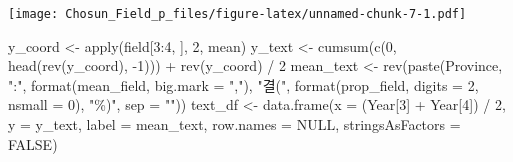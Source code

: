 \documentclass[
]{article}
\newenvironment{Shaded}{\begin{snugshade}}{\end{snugshade}}
\newcommand{\AttributeTok}[1]{\textcolor[rgb]{0.77,0.63,0.00}{#1}}
\newcommand{\ConstantTok}[1]{\textcolor[rgb]{0.00,0.00,0.00}{#1}}
\newcommand{\DecValTok}[1]{\textcolor[rgb]{0.00,0.00,0.81}{#1}}
\newcommand{\FunctionTok}[1]{\textcolor[rgb]{0.00,0.00,0.00}{#1}}
\newcommand{\NormalTok}[1]{#1}
\newcommand{\OtherTok}[1]{\textcolor[rgb]{0.56,0.35,0.01}{#1}}
\newcommand{\SpecialCharTok}[1]{\textcolor[rgb]{0.00,0.00,0.00}{#1}}
\newcommand{\StringTok}[1]{\textcolor[rgb]{0.31,0.60,0.02}{#1}}
\begin{document}
\texttt{[image: Chosun\_Field\_p\_files/figure-latex/unnamed-chunk-7-1.pdf]}

\begin{Shaded}
\begin{Highlighting}[]
\NormalTok{y\_coord }\OtherTok{\textless{}{-}} \FunctionTok{apply}\NormalTok{(field[}\DecValTok{3}\SpecialCharTok{:}\DecValTok{4}\NormalTok{, ], }\DecValTok{2}\NormalTok{, mean)}
\NormalTok{y\_text }\OtherTok{\textless{}{-}} \FunctionTok{cumsum}\NormalTok{(}\FunctionTok{c}\NormalTok{(}\DecValTok{0}\NormalTok{, }\FunctionTok{head}\NormalTok{(}\FunctionTok{rev}\NormalTok{(y\_coord), }\SpecialCharTok{{-}}\DecValTok{1}\NormalTok{))) }\SpecialCharTok{+} \FunctionTok{rev}\NormalTok{(y\_coord) }\SpecialCharTok{/} \DecValTok{2}
\NormalTok{mean\_text }\OtherTok{\textless{}{-}} \FunctionTok{rev}\NormalTok{(}\FunctionTok{paste}\NormalTok{(Province, }
                       \StringTok{":"}\NormalTok{, }
                       \FunctionTok{format}\NormalTok{(mean\_field, }\AttributeTok{big.mark =} \StringTok{","}\NormalTok{), }
                       \StringTok{"결("}\NormalTok{, }
                       \FunctionTok{format}\NormalTok{(prop\_field, }\AttributeTok{digits =} \DecValTok{2}\NormalTok{, }\AttributeTok{nsmall =} \DecValTok{0}\NormalTok{), }
                       \StringTok{"\%)"}\NormalTok{, }
                       \AttributeTok{sep =} \StringTok{""}\NormalTok{))}
\NormalTok{text\_df }\OtherTok{\textless{}{-}} \FunctionTok{data.frame}\NormalTok{(}\AttributeTok{x =}\NormalTok{ (Year[}\DecValTok{3}\NormalTok{] }\SpecialCharTok{+}\NormalTok{ Year[}\DecValTok{4}\NormalTok{]) }\SpecialCharTok{/} \DecValTok{2}\NormalTok{, }
                      \AttributeTok{y =}\NormalTok{ y\_text, }
                      \AttributeTok{label =}\NormalTok{ mean\_text, }
                      \AttributeTok{row.names =} \ConstantTok{NULL}\NormalTok{, }
                      \AttributeTok{stringsAsFactors =} \ConstantTok{FALSE}\NormalTok{)}
\end{Highlighting}
\end{Shaded}
\end{document}

